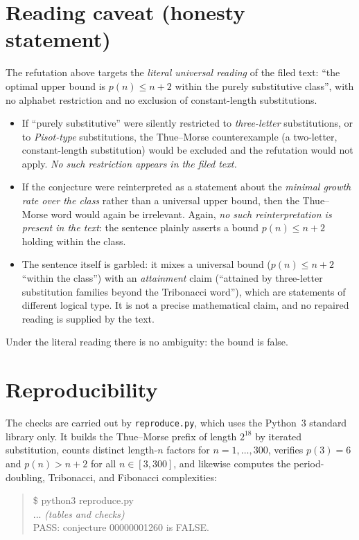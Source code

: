 \documentclass[11pt]{article}
\theoremstyle{definition}
\theoremstyle{remark}
\newcommand{\code}[1]{\texttt{#1}}
\begin{document}
\section{Reading caveat (honesty statement)}

The refutation above targets the \emph{literal universal reading} of the filed
text: ``the optimal upper bound is $p(n) \le n+2$ within the purely
substitutive class'', with no alphabet restriction and no exclusion of
constant-length substitutions.

\begin{itemize}
\item If ``purely substitutive'' were silently restricted to \emph{three-letter}
substitutions, or to \emph{Pisot-type} substitutions, the Thue--Morse
counterexample (a two-letter, constant-length substitution) would be excluded
and the refutation would not apply. \emph{No such restriction appears in the
filed text.}
\item If the conjecture were reinterpreted as a statement about the
\emph{minimal growth rate over the class} rather than a universal upper bound,
then the Thue--Morse word would again be irrelevant. Again, \emph{no such
reinterpretation is present in the text}: the sentence plainly asserts a bound
$p(n) \le n+2$ holding within the class.
\item The sentence itself is garbled: it mixes a universal bound
($p(n) \le n+2$ ``within the class'') with an \emph{attainment} claim
(``attained by three-letter substitution families beyond the Tribonacci
word''), which are statements of different logical type. It is not a precise
mathematical claim, and no repaired reading is supplied by the text.
\end{itemize}

\noindent Under the literal reading there is no ambiguity: the bound is false.

\section{Reproducibility}

The checks are carried out by \code{reproduce.py}, which uses the Python~3
standard library only. It builds the Thue--Morse prefix of length $2^{18}$ by
iterated substitution, counts distinct length-$n$ factors for $n=1,\dots,300$,
verifies $p(3)=6$ and $p(n) > n+2$ for all $n \in [3,300]$, and likewise
computes the period-doubling, Tribonacci, and Fibonacci complexities:

\begin{quote}\ttfamily
\$ python3 reproduce.py\\
... \textit{(tables and checks)}\\
PASS: conjecture 00000001260 is FALSE.
\end{quote}
\end{document}
